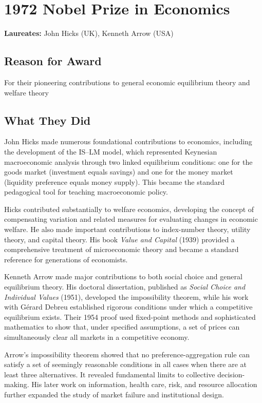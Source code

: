 \chapter{1972 Nobel Prize in Economics}
\textbf{Laureates: }John Hicks (UK), Kenneth Arrow (USA)

\section*{Reason for Award}
For their pioneering contributions to general economic equilibrium theory and welfare theory

\section{What They Did}
John Hicks made numerous foundational contributions to economics, including the development of
the IS--LM model, which represented Keynesian macroeconomic analysis through two linked equilibrium
conditions:
one for the goods market (investment equals savings) and one for the money market (liquidity
preference equals money supply). This became the standard pedagogical tool for teaching
macroeconomic policy.

Hicks contributed substantially to welfare economics, developing the concept of compensating
variation and related measures for evaluating changes in economic welfare. He also made important
contributions to index-number theory, utility theory, and capital theory. His book \textit{Value
and Capital} (1939) provided a comprehensive treatment
of microeconomic theory and became a standard reference for generations of economists.

Kenneth Arrow made major contributions to both social choice and general equilibrium theory. His
doctoral dissertation, published as \textit{Social Choice and Individual Values} (1951), developed
the impossibility theorem, while his work with Gérard Debreu established rigorous conditions under
which a competitive equilibrium exists. Their 1954 proof used fixed-point methods and sophisticated
mathematics to show that, under specified assumptions, a set of prices can simultaneously clear
all markets in a competitive economy.

Arrow's impossibility theorem showed that no preference-aggregation rule can satisfy a set of
seemingly reasonable conditions in all cases when there are at least three alternatives. It
revealed fundamental limits to collective decision-making. His later work on information, health
care, risk, and resource allocation further expanded the study of market failure and institutional
design.

